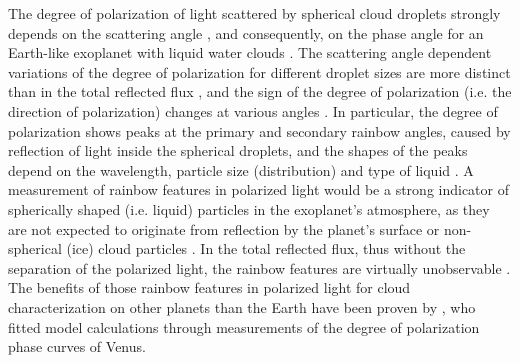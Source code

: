 \documentclass[
    usenatbib,
]{mnras}
\begin{document}
The degree of polarization of light scattered by spherical cloud droplets strongly depends on the scattering angle \citep[see][]{hansentravis1974}, and consequently, on the phase angle for an Earth-like exoplanet with liquid water clouds \citep{stam2008}. The scattering angle dependent variations of the degree of polarization for different droplet sizes are more distinct than in the total reflected flux \citep{karalidi2011}, and the sign of the degree of polarization (i.e. the direction of polarization) changes at various angles \citep{stam2008,trees2022}. In particular, the degree of polarization shows peaks at the primary and secondary rainbow angles, caused by reflection of light inside the spherical droplets, and the shapes of the peaks depend on the wavelength, particle size (distribution) and type of liquid  \citep{hansentravis1974,bailey2007,bailey2018}. 
A measurement of rainbow features in polarized light would be a strong indicator of spherically shaped (i.e. liquid) particles in the exoplanet's atmosphere, as they are not expected to originate from reflection by the planet's surface or non-spherical (ice) cloud particles \citep{Karalidi2012ice}. In the total reflected flux, thus without the separation of the polarized light, the rainbow features are virtually unobservable \citep{karalidi2011}. The benefits of those rainbow features in polarized light for cloud characterization on other planets than the Earth have been proven by \citet{hansenhovenier1974}, who fitted model calculations through measurements of the degree of polarization phase curves of Venus. %








\end{document}
